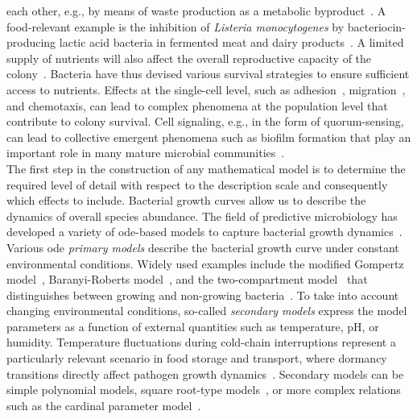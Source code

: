 \documentclass[10pt,1p,authoryear]{elsarticle}
\numberwithin{equation}{section}
\begin{document}
each other, e.g., by means of waste production as a metabolic byproduct~\citep{west_social_2007, rainey_evolution_2003, hibbing_bacterial_2010, stubbendieck_bacterial_2016}.
A food-relevant example is the inhibition of \textit{Listeria monocytogenes} by bacteriocin-producing lactic acid bacteria in fermented meat and dairy products~\citep{cotterBacteriocinsDeveloping2005, rileyBacteriocinsEvolution2002}.
A limited supply of nutrients will also affect the overall reproductive capacity of the colony~\citep{monod_growth_1949}.
Bacteria have thus devised various survival strategies to ensure sufficient access to nutrients. Effects at the single-cell level, such as adhesion~\citep{htuson_bacteriasurface_2013}, migration~\citep{decoene_microscopic_2011}, and chemotaxis, can lead to complex phenomena at the population level that contribute to colony survival.
Cell signaling, e.g., in the form of quorum-sensing, can lead to collective emergent phenomena such as biofilm formation that play an important role in many mature microbial communities~\citep{Jin2020,ng_bacterial_2009}.\\
%
The first step in the construction of any mathematical model is to determine the required level of
detail with respect to the description scale and consequently which effects to include.
Bacterial growth curves allow us to describe the dynamics of overall species abundance.
The field of predictive microbiology has developed a variety of \ac{ode}-based models to capture bacterial growth dynamics~\citep{perez-rodriguez_predictive_2012, gaindrik_experimental_2025}.
Various \ac{ode} \textit{primary models} describe the bacterial growth curve under constant environmental conditions.
Widely used examples include the modified Gompertz model~\citep{Zwietering1990,Gompertz1825-wi,Gibson1987}, Baranyi-Roberts
model~\citep{baranyi_modeling_1993, baranyi_dynamic_1994}, and the two-compartment model~\citep{McKellar1997} that distinguishes between growing and non-growing bacteria~\citep{buchanan_when_1997}.
To take into account changing environmental conditions, so-called \textit{secondary models}
express the model parameters as a function of external quantities such as temperature, pH, or
humidity.
Temperature fluctuations during cold-chain interruptions represent a particularly relevant scenario in food storage and transport, where
dormancy transitions directly affect pathogen growth dynamics~\citep{swinnen_predictive_2004}.
Secondary models can be simple polynomial models, square root-type models~\citep{ratkowsky_relationship_1982}, or
more complex relations such as the cardinal parameter model~\citep{zwietering_decision_1992}.
\end{document}
